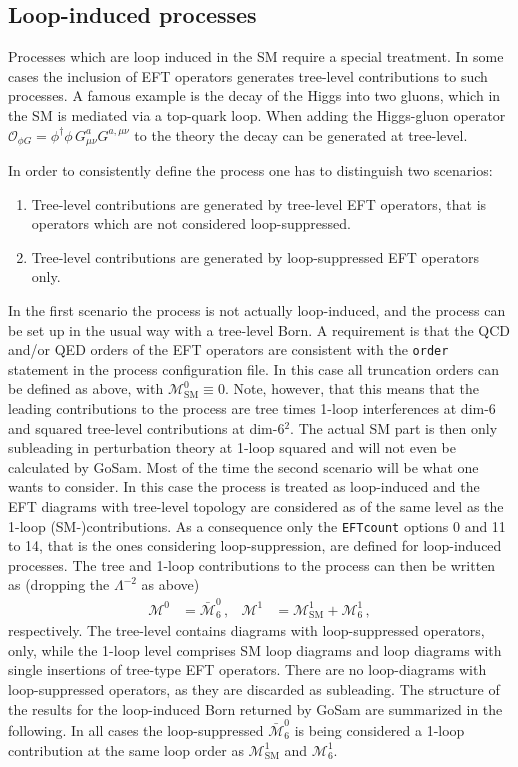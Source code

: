 \documentclass[11pt,a4paper]{refrep}
\newcommand{\gosam}{{\sc GoSam}\xspace}
\def\M{\mathcal{M}}
\begin{document}
\subsection{Loop-induced processes}\label{sec:loop-induced}
Processes which are loop induced in the SM require a special treatment. In some cases the inclusion of EFT operators generates tree-level contributions to such processes. A famous example is the decay of the Higgs into two gluons, which in the SM is mediated via a top-quark loop. When adding the Higgs-gluon operator $\mathcal{O}_{\phi G} = \phi^\dagger\phi\,G^a_{\mu\nu}G^{a,\mu\nu}$ to the theory the decay can be generated at tree-level.

In order to consistently define the process one has to distinguish two scenarios:
\begin{enumerate}
   \item Tree-level contributions are generated by tree-level EFT operators, that is operators which are not considered loop-suppressed.
   \item Tree-level contributions are generated by loop-suppressed EFT operators only.
\end{enumerate}
In the first scenario the process is not actually loop-induced, and the process can be set up in the usual way with a tree-level Born. A requirement is that the QCD and/or QED orders of the EFT operators are consistent with the \texttt{order} statement in the process configuration file. In this case all truncation orders can be defined as above, with $\M_\mathrm{SM}^0\equiv0$. Note, however, that this means that the leading contributions to the process are tree times 1-loop interferences at dim-6 and squared tree-level contributions at dim-6$^2$. The actual SM part is then only subleading in perturbation theory at 1-loop squared and will not even be calculated by \gosam. Most of the time the second scenario will be what one wants to consider. In this case the process is treated as loop-induced and the EFT diagrams with tree-level topology are considered as of the same level as the 1-loop (SM-)contributions. As a consequence only the \texttt{EFTcount} options 0 and 11 to 14, that is the ones considering loop-suppression, are defined for loop-induced processes. The tree and 1-loop contributions to the process can then be written as (dropping the $\Lambda^{-2}$ as above)
\begin{align}
   \M^0 &= \bar{\M}_6^0\,, & \M^1 &= \M_\mathrm{SM}^1 + \M_6^1\,,
\end{align}
respectively. The tree-level contains diagrams with loop-suppressed operators, only, while the 1-loop level comprises SM loop diagrams and loop diagrams with single insertions of tree-type EFT operators. There are no loop-diagrams with loop-suppressed operators, as they are discarded as subleading. The structure of the results for the loop-induced Born returned by \gosam are summarized in the following. In all cases the loop-suppressed $\bar{\M}_6^0$ is being considered a 1-loop contribution at the same loop order as $\M_\mathrm{SM}^1$ and $\M_6^1$.
\end{document}

